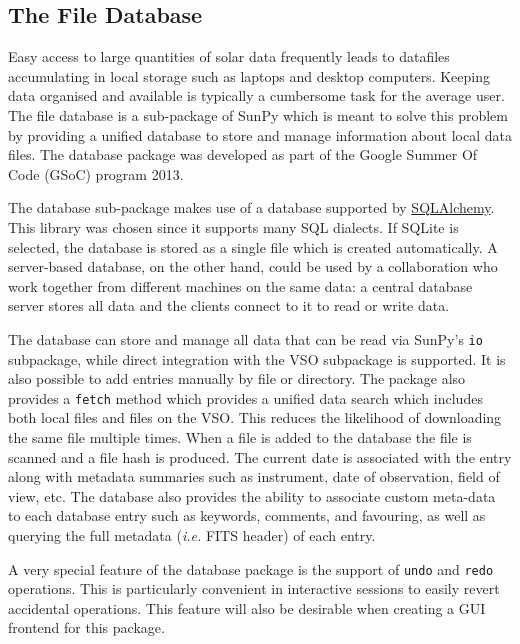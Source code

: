 \subsection{The File Database}\label{ssec:db}

Easy access to large quantities of solar data frequently leads to datafiles accumulating
in local storage such as laptops and desktop computers. Keeping data organised and available
is typically a cumbersome task for the average user. The file database is a sub-package of 
SunPy which is meant to solve this problem by providing a unified database to store and manage information about 
local data files. The database package was developed as part of the Google 
Summer Of Code (GSoC) program 2013.

The database sub-package makes use of a database supported by
\href{http://www.sqlalchemy.org}{SQLAlchemy}. This library was chosen
since it supports many SQL dialects. 
If SQLite is selected, the database is stored as a single file which is
created automatically. A server-based database, on the other hand, could be used
by a collaboration who work together from different machines on the
same data: a central database server stores all data and the clients connect to
it to read or write data.

The database can store and manage all data that can be read via SunPy's 
\texttt{io} subpackage, while direct integration with the \textsc{VSO} 
subpackage is supported.
It is also possible to add entries manually by file or directory. The package also provides
a \texttt{fetch} method which provides a unified data search which includes both local files
and files on the \textsc{VSO}. This reduces the likelihood of downloading the same file 
multiple times. When a file is added to the database the file is scanned and a file hash is produced. 
The current date is associated with the entry along with metadata summaries such 
as instrument, date of observation, field of view, etc. 
The database also provides the ability to associate custom meta-data to 
each database entry such as keywords, comments, and favouring, as well as 
querying the full metadata (\textit{i.e.} FITS header) of each entry.

A very special feature of the database package is the support of \texttt{undo}
and \texttt{redo} operations. This is particularly convenient in
interactive sessions to easily revert accidental operations. 
This feature will also be desirable when creating a GUI frontend for this package.

